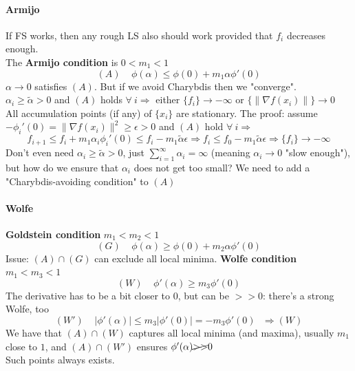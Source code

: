 \documentclass[10pt]{report}
\begin{document}
\paragraph{Armijo} If FS works, then any rough LS also should work provided that $f_i$ decreases enough.\\
The \textbf{Armijo condition} is $0 < m_1 < 1$
$$(A)\:\:\:\:\:\phi(\alpha)\leq \phi(0)+m_1\alpha\phi'(0)$$
$\alpha \rightarrow 0$ satisfies $(A)$. But if we avoid Charybdis then we "converge".\\
$\alpha_i\geq \tilde{\alpha} > 0$ and $(A)$ holds $\forall\:i\Rightarrow$ either $\{f_i\}\rightarrow -\infty$ or $\{\|\nabla f(x_i)\|\}\rightarrow 0$\\
All accumulation points (if any) of $\{x_i\}$ are stationary. The proof: assume $-\phi_i'(0) = \|\nabla f(x_i)\|^2\geq \epsilon > 0$ and $(A)$ hold $\forall\:i\Rightarrow$ $$f_{i+1} \leq f_i + m_1\alpha_i\phi_i'(0)\leq f_i - m_1\tilde{\alpha}\epsilon \Rightarrow f_i \leq f_0 - m_1\tilde{\alpha}\epsilon \Rightarrow \{f_i\}\rightarrow -\infty$$ Don't even need $\alpha_i\geq \tilde{\alpha} > 0$, just $\sum_{i=1}^\infty \alpha_i = \infty$ (meaning $\alpha_i\rightarrow 0$ "slow enough"), but how do we ensure that $\alpha_i$ does not get too small? We need to add a "Charybdis-avoiding condition" to $(A)$
\paragraph{Wolfe} \textbf{Goldstein condition} $m_1 < m_2 < 1$
	$$(G)\:\:\:\:\:\phi(\alpha)\geq \phi(0) + m_2\alpha\phi'(0)$$
Issue: $(A)\cap (G)$ can exclude all local minima. \textbf{Wolfe condition} $m_1 < m_3 < 1$
	$$(W)\:\:\:\:\:\phi'(\alpha)\geq m_3\phi'(0)$$
The derivative has to be a bit closer to $0$, but can be $>>0$: there's a strong Wolfe, too
	$$(W')\:\:\:\:\:|\phi'(\alpha)|\leq m_3|\phi'(0)| = -m_3\phi'(0)\:\:\:\Rightarrow (W)$$
We have that $(A)\cap (W)$ captures all local minima (and maxima), usually $m_1$ close to $1$, and $(A)\cap(W')$ ensures $\phi'(\alpha) \cancel{>>}0$\\
Such points always exists.
\end{document}
